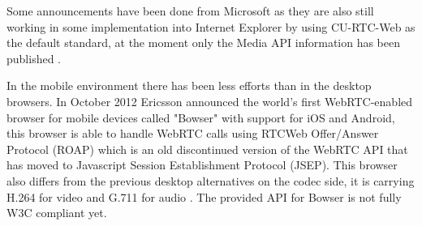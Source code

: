Some announcements have been done from Microsoft as they are also still working in some implementation into Internet Explorer by using CU-RTC-Web as the default standard, at the moment only the Media API information has been published \cite{microsoftcapture}.

In the mobile environment there has been less efforts than in the desktop browsers. In October 2012 Ericsson announced the world's first WebRTC-enabled browser for mobile devices called "Bowser" with support for iOS and Android, this browser is able to handle WebRTC calls using RTCWeb Offer/Answer Protocol (ROAP) which is an old discontinued version of the WebRTC API that has moved to Javascript Session Establishment Protocol (JSEP). This browser also differs from the previous desktop alternatives on the codec side, it is carrying H.264 for video and G.711 for audio \cite{ericssonbowser}. The provided API for Bowser is not fully W3C compliant yet.